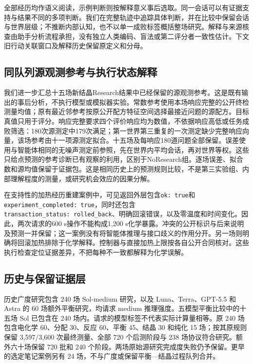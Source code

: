 \documentclass[10pt,a4paper]{article}
\begin{document}
全部经历均作语义阅读，示例判断则按解释意义事后选取。同一会话可以有证据支持与结果不同的多项判断。我们在完整轨迹中追踪具体判断，并在比较中保留会话与世界层级；不推断内部认知，也不以单一成败标签概括整场研究。解释与来源核查由助手分析流程承担，没有独立人类编码、盲法或第二评分者一致性估计。下文旧行动关联窗口及解释历史保留原定义和分母。

\subsection{同队列源观测参考与执行状态解释}\label{ux540cux961fux5217ux6e90ux89c2ux6d4bux53c2ux8003ux4e0eux6267ux884cux72b6ux6001ux89e3ux91ca}

我们进一步汇总十五场新结晶Research结果中已经保留的源观测参考。这是既有输出的事后分析，不执行模型或模拟器实验。常数参考使用本场响应完整的公开终检测量均值；原有最近邻参考按原公开配方特征空间选择最接近问题的源配方。目标真值只用于评分。响应完整要求四个评价响应均为数值，不依据响应高低或任务成败筛选：180次源测定中179次满足；第一世界第三重复的一次测定缺少完整响应向量，该场参考由十一项源测定拟合。十五场及每响应180道问题全部保留。误差使用与智能体相同的无噪声测定前参照，先在世界内平均会话，再对世界等权。这些只给点预测的参考诊断已有观察的利用，区别于NoResearch组。逐场误差、拟合数和源均值保留于证据包。这是相同历史上的预测规则比较，不是第三实验组、内部理解程度的测量，或研究机会效应的因果分解。

在支持性的加热经历重建案例中，可见返回外层包含\texttt{ok:\ true}和\texttt{experiment\_completed:\ true}，同时还包含\texttt{transaction\_status:\ rolled\_back}、明确回滚错误，以及零温度和时间变化。因此，两次请求的600 s操作不能构成1,200 s化学暴露。冲突的公开标识与后来说明及预测一并保留；这一案例没有将智能体推理与接口歧义的作用分开。另一场则明确将回滚加热排除于化学解释。控制器与直接加热上限按各自公开合同核对。这些执行检查定位证据差异，不把每种不一致都解释为化学误解。

\subsection{历史与保留证据层}\label{ux5386ux53f2ux4e0eux4fddux7559ux8bc1ux636eux5c42}

历史广度研究包含 240 场 Sol-medium 研究，以及 Luna、Terra、GPT-5.5 和 Astra 的 60 场额外平衡研究，均请求 medium 推理强度。五模型平衡比较中的十五场 Sol 已包含在 240 场内。请求的模型标签不代表实际计算量相等。原 240 场包含电化学 60、分配 30、反应 60、平衡 45、结晶 30 和纯化 15 场；按其原规则保留 3,597/3,600 次最终测量、全部 720 个后测阶段与 238 场协议符合研究。额外六十场保留 720 批和 240 个阶段。两场原始源研究完成度失败仍予保留。更早的选定笔记案例另有 24 场，不与广度或保留平衡---结晶过程队列合并。
\end{document}
